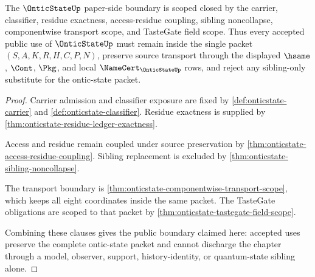 \begin{theorem}
\label{thm:onticstate-scoped-closure-package}
The $\OnticStateUp$ paper-side boundary is scoped closed by the carrier, classifier, residue exactness, access-residue coupling, sibling noncollapse, componentwise transport scope, and TasteGate field scope. Thus every accepted public use of $\OnticStateUp$ must remain inside the single packet $(S,A,K,R,H,C,P,N)$, preserve source transport through the displayed $\hsame$, $\Cont$, $\Pkg$, and local $\NameCert_{\OnticStateUp}$ rows, and reject any sibling-only substitute for the ontic-state packet.
\end{theorem}
\begin{proof}
Carrier admission and classifier exposure are fixed by \autoref{def:onticstate-carrier} and \autoref{def:onticstate-classifier}. Residue exactness is supplied by \autoref{thm:onticstate-residue-ledger-exactness}.

Access and residue remain coupled under source preservation by \autoref{thm:onticstate-access-residue-coupling}. Sibling replacement is excluded by \autoref{thm:onticstate-sibling-noncollapse}.

The transport boundary is \autoref{thm:onticstate-componentwise-transport-scope}, which keeps all eight coordinates inside the same packet. The TasteGate obligations are scoped to that packet by \autoref{thm:onticstate-tastegate-field-scope}.

Combining these clauses gives the public boundary claimed here: accepted uses preserve the complete ontic-state packet and cannot discharge the chapter through a model, observer, support, history-identity, or quantum-state sibling alone.
\end{proof}

